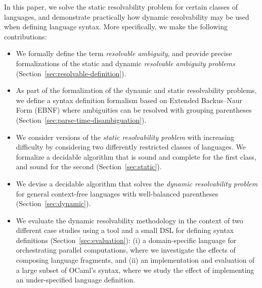 \documentclass[runningheads]{llncs}
\begin{document}

In this paper, we solve the static resolvability problem for certain classes of languages, and demonstrate practically how dynamic resolvability may be used when defining language syntax. More specifically, we make the following contributions:

\begin{itemize}
\item We formally define the term \emph{resolvable ambiguity}, and
  provide precise formalizations of the static and dynamic
  \emph{resolvable ambiguity problems}
  (Section~\ref{sec:resolvable-definition}).
\item As part of the formalization of the dynamic and static resolvability problems, we define a syntax definition formalism based on Extended Backus–Naur Form (EBNF) where ambiguities can be resolved with grouping parentheses (Section~\ref{sec:parse-time-disambiguation}).
\item We consider versions of the \emph{static resolvability
    problem} with increasing difficulty by considering two
  differently restricted classes of languages. We formalize a
  decidable algorithm that is sound and complete for the first
  class, and sound for the second (Section~\ref{sec:static}).
\item We devise a decidable algorithm that solves the
  \emph{dynamic resolvability problem} for general context-free
  languages with well-balanced parentheses
  (Section~\ref{sec:dynamic}).
\item We evaluate the dynamic resolvability methodology in the context of two
  different case studies using a tool and a small DSL for defining
  syntax definitions (Section~\ref{sec:evaluation}): (i) a
  domain-specific language for orchestrating parallel
  computations, where we investigate the effects of composing
  language fragments, and (ii) an implementation and evaluation of
  a large subset of OCaml's syntax, where we study the effect of
  implementing an under-specified language definition.
\end{itemize}
\end{document}
